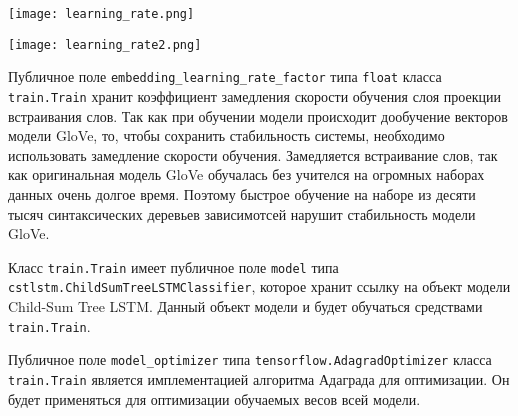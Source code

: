 \begin{center}
  \texttt{[image: learning\_rate.png]}
  \label{fig:func:learning_rate}
\end{center}

\begin{center}
  \texttt{[image: learning\_rate2.png]}
  \label{fig:func:learning_rate2}
\end{center}

Публичное поле \texttt{embedding\_learning\_rate\_factor} типа \texttt{float} класса \texttt{train.Train} хранит коэффициент замедления скорости обучения слоя проекции встраивания слов. Так как при обучении модели происходит дообучение векторов модели GloVe, то, чтобы сохранить стабильность системы, необходимо использовать замедление скорости обучения. Замедляется встраивание слов, так как оригинальная модель GloVe обучалась без учителся на огромных наборах данных очень долгое время. Поэтому быстрое обучение на наборе из десяти тысяч синтаксических деревьев зависимотсей нарушит стабильность модели GloVe.

Класс \texttt{train.Train} имеет публичное поле \texttt{model} типа \texttt{cstlstm.Child\-SumTreeLSTMClassifier}, которое хранит ссылку на объект модели Child-Sum Tree LSTM\@. Данный объект модели и будет обучаться средствами \texttt{train.Tra\-in}.

Публичное поле \texttt{model\_optimizer} типа \texttt{tensorflow.AdagradOptimiz\-er} класса \texttt{train.Train} является имплементацией алгоритма Адаграда для оптимизации. Он будет применяться для оптимизации обучаемых весов всей модели.

